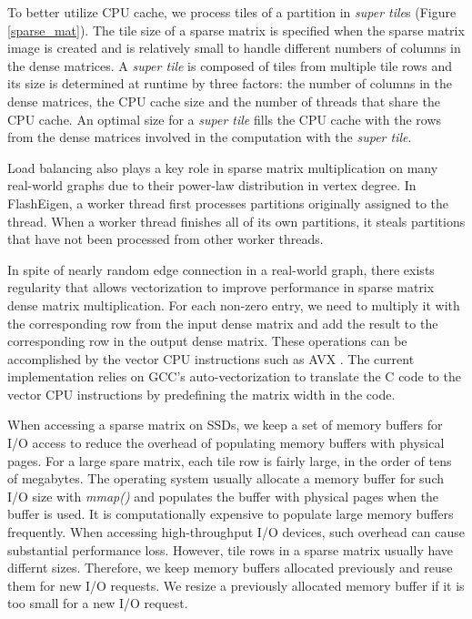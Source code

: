 To better utilize CPU cache, we process tiles of a partition in
\textit{super tile}s (Figure \ref{sparse_mat}). The tile size of a sparse
matrix is specified when the sparse matrix image is created and is relatively
small to handle different numbers of columns in the dense matrices.
A \textit{super tile} is composed of tiles from multiple tile rows and its
size is determined at runtime by three factors: the number of columns
in the dense matrices, the CPU cache size and the number of threads that
share the CPU cache. An optimal size for a \textit{super tile} fills
the CPU cache with the rows from the dense matrices involved in
the computation with the \textit{super tile}.

Load balancing also plays a key role in sparse matrix multiplication on
many real-world graphs due to their power-law distribution in vertex degree.
In FlashEigen, a worker thread first processes partitions originally assigned
to the thread. When a worker thread finishes
all of its own partitions, it steals partitions that have not been processed
from other worker threads.

In spite of nearly random edge connection in a real-world graph,
there exists regularity that allows vectorization to improve performance
in sparse matrix dense matrix multiplication. For each non-zero entry, we
need to multiply it with the corresponding row from the input dense matrix
and add the result to the corresponding row in the output dense matrix.
These operations can be accomplished by the vector CPU instructions such as
AVX \cite{avx}. The current implementation relies on GCC's auto-vectorization
to translate the C code to the vector CPU instructions by predefining the matrix
width in the code.

When accessing a sparse matrix on SSDs, we keep a set of memory buffers for
I/O access to reduce the overhead of populating memory buffers with physical
pages. For a large spare matrix, each tile row is fairly large, in the order
of tens of megabytes. The operating system usually allocate a memory buffer
for such I/O size with \textit{mmap()} and populates the buffer with physical
pages when the buffer is used. It is computationally expensive to populate
large memory buffers frequently. When accessing high-throughput I/O devices,
such overhead can cause substantial performance loss. However, tile rows
in a sparse matrix usually have differnt sizes. Therefore, we keep memory buffers
allocated previously and reuse them for new I/O requests. We resize a previously
allocated memory buffer if it is too small for a new I/O request.


